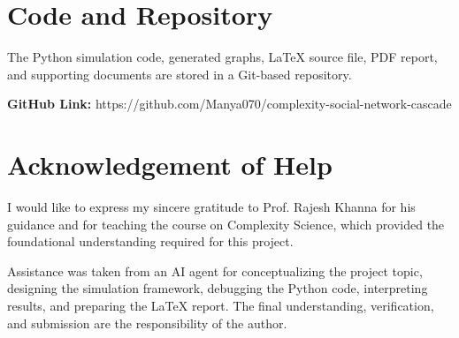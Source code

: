 \documentclass[12pt]{article}
\begin{document}
\section{Code and Repository}

The Python simulation code, generated graphs, LaTeX source file, PDF report, and supporting documents are stored in a Git-based repository.

\textbf{GitHub Link:} https://github.com/Manya070/complexity-social-network-cascade


\section{Acknowledgement of Help}

I would like to express my sincere gratitude to Prof. Rajesh Khanna for his guidance and for teaching the course on Complexity Science, which provided the foundational understanding required for this project.

Assistance was taken from an AI agent for conceptualizing the project topic, designing the simulation framework, debugging the Python code, interpreting results, and preparing the LaTeX report. The final understanding, verification, and submission are the responsibility of the author.
\end{document}
